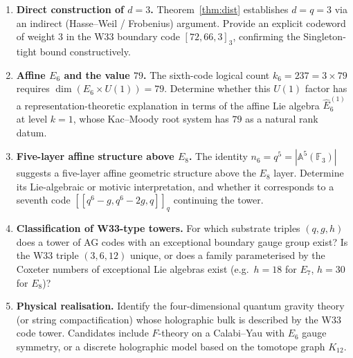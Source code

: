 \begin{enumerate}

\item \textbf{Direct construction of $d=3$.}
Theorem~\ref{thm:dist} establishes $d=q=3$ via an indirect
(Hasse--Weil / Frobenius) argument.
Provide an explicit codeword of weight $3$ in the W33 boundary
code $[72, 66, 3]_3$, confirming the Singleton-tight bound constructively.

\item \textbf{Affine $E_6$ and the value $79$.}
The sixth-code logical count $k_6 = 237 = 3 \times 79$ requires
$\dim(E_6 \times U(1)) = 79$.
Determine whether this $U(1)$ factor has a representation-theoretic
explanation in terms of the affine Lie algebra $\widehat{E}_6^{(1)}$
at level $k=1$, whose Kac--Moody root system has $79$ as a
natural rank datum.

\item \textbf{Five-layer affine structure above $E_8$.}
The identity $n_6 = q^5 = |\mathbb{A}^5(\mathbb{F}_3)|$ suggests a
five-layer affine geometric structure above the $E_8$ layer.
Determine its Lie-algebraic or motivic interpretation,
and whether it corresponds to a seventh code $[[q^6 - g, q^6 - 2g, q]]_q$
continuing the tower.

\item \textbf{Classification of W33-type towers.}
For which substrate triples $(q, g, h)$ does a tower of AG codes
with an exceptional boundary gauge group exist?
Is the W33 triple $(3, 6, 12)$ unique, or does a family parameterised
by the Coxeter numbers of exceptional Lie algebras exist
(e.g.\ $h = 18$ for $E_7$, $h = 30$ for $E_8$)?

\item \textbf{Physical realisation.}
Identify the four-dimensional quantum gravity theory (or string
compactification) whose holographic bulk is described by the W33
code tower. Candidates include $F$-theory on a Calabi--Yau
with $E_6$ gauge symmetry, or a discrete holographic model
based on the tomotope graph $K_{12}$.

\end{enumerate}

